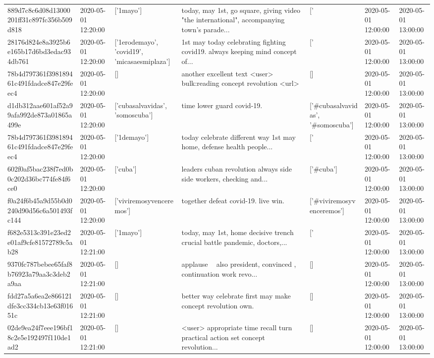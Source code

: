 \begin{tabular}{lllllll}
889d7c8c6d08d13000201ff31c897fc356b509d818 & 2020-05-01 12:20:00 & ['1mayo'] & today, may 1st, go square, giving video "the international", accompanying town's parade... & ['#1mayo'] & 2020-05-01 12:00:00 & 2020-05-01 13:00:00 \\
28176d824e8a3925b6e165b17d6bd3edac934db761 & 2020-05-01 12:20:00 & ['1erodemayo', 'covid19', 'micasaesmiplaza'] & 1st may today celebrating fighting covid19. always keeping mind concept of... & ['#1erodemayo', '#covid19', '#micasaesmiplaza'] & 2020-05-01 12:00:00 & 2020-05-01 13:00:00 \\
78b4d797361f398189461c491fdadce847e29feec4 & 2020-05-01 12:20:00 & [] & another excellent text <user> bulk:reading concept revolution <url> & [] & 2020-05-01 12:00:00 & 2020-05-01 13:00:00 \\
d1db312aae601af52a99afa992de873a01865a499e & 2020-05-01 12:20:00 & ['cubasalvavidas', 'somoscuba'] & time lower guard covid-19. & ['#cubasalvavidas', '#somoscuba'] & 2020-05-01 12:00:00 & 2020-05-01 13:00:00 \\
78b4d797361f398189461c491fdadce847e29feec4 & 2020-05-01 12:20:00 & ['1demayo'] & today celebrate different way 1st may home, defense health people... & ['#1demayo'] & 2020-05-01 12:00:00 & 2020-05-01 13:00:00 \\
602f0af5bac238f7ed0b0c202d36bc774fe84f6ce0 & 2020-05-01 12:20:00 & ['cuba'] & leaders cuban revolution always side side workers, checking and... & ['#cuba'] & 2020-05-01 12:00:00 & 2020-05-01 13:00:00 \\
f0a24f6b45a9d55b0d0240d90d56c6a501493fc144 & 2020-05-01 12:20:00 & ['viviremosyvenceremos'] & together defeat covid-19. live win. & ['#viviremosyvenceremos'] & 2020-05-01 12:00:00 & 2020-05-01 13:00:00 \\
f682e5313c391e23ed2e01af9cfe81572789c5ab28 & 2020-05-01 12:21:00 & ['1mayo'] & today, may 1st, home decisive trench crucial battle pandemic, doctors,... & ['#1mayo'] & 2020-05-01 12:00:00 & 2020-05-01 13:00:00 \\
9370fc787bebee65faf8b76923a79aa3c3deb2a9aa & 2020-05-01 12:21:00 & [] & applause 👏👏 also president, convinced , continuation work revo... & [] & 2020-05-01 12:00:00 & 2020-05-01 13:00:00 \\
fdd27a5a6ea2e866121dfe3cc334cb13e63f01651c & 2020-05-01 12:21:00 & [] & better way celebrate first may make concept revolution own. & [] & 2020-05-01 12:00:00 & 2020-05-01 13:00:00 \\
02de9ea24f7eee196bf18c2e5e192497f110de1ad2 & 2020-05-01 12:21:00 & [] & <user> appropriate time recall turn practical action set concept revolution... & [] & 2020-05-01 12:00:00 & 2020-05-01 13:00:00 \\

\end{tabular}
